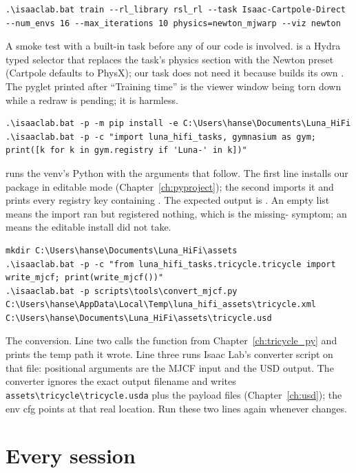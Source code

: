 \begin{lstlisting}[style=shell]
.\isaaclab.bat train --rl_library rsl_rl --task Isaac-Cartpole-Direct --num_envs 16 --max_iterations 10 physics=newton_mjwarp --viz newton
\end{lstlisting}
A smoke test with a built-in task before any of our code is involved.
 is a Hydra typed selector that replaces the
task's physics section with the Newton preset (Cartpole defaults to PhysX);
our task does not need it because  builds its own
. The pyglet  printed after
``Training time'' is the viewer window being torn down while a redraw is
pending; it is harmless.

\begin{lstlisting}[style=shell]
.\isaaclab.bat -p -m pip install -e C:\Users\hanse\Documents\Luna_HiFi
.\isaaclab.bat -p -c "import luna_hifi_tasks, gymnasium as gym; print([k for k in gym.registry if 'Luna-' in k])"
\end{lstlisting}
 runs the venv's Python with the arguments that follow. The first
line installs our package in editable mode (Chapter~\ref{ch:pyproject}); the
second imports it and prints every registry key containing . The
expected output is . An empty list means the
import ran but registered nothing, which is the missing-
symptom; an  means the editable install did not take.

\begin{lstlisting}[style=shell]
mkdir C:\Users\hanse\Documents\Luna_HiFi\assets
.\isaaclab.bat -p -c "from luna_hifi_tasks.tricycle.tricycle import write_mjcf; print(write_mjcf())"
.\isaaclab.bat -p scripts\tools\convert_mjcf.py C:\Users\hanse\AppData\Local\Temp\luna_hifi_assets\tricycle.xml C:\Users\hanse\Documents\Luna_HiFi\assets\tricycle.usd
\end{lstlisting}
The conversion. Line two calls the function from Chapter~\ref{ch:tricycle_py}
and prints the temp path it wrote. Line three runs Isaac Lab's converter
script on that file: positional arguments are the MJCF input and the USD
output. The converter ignores the exact output filename and writes
\texttt{assets\textbackslash tricycle\textbackslash tricycle.usda} plus the payload files
(Chapter~\ref{ch:usd}); the env cfg points at that real location. Run these
two lines again whenever  changes.

\section{Every session}


